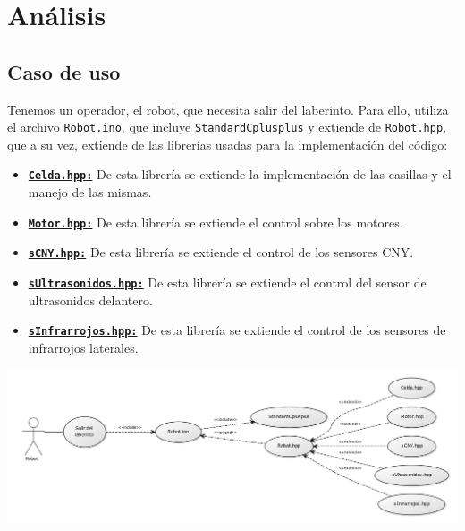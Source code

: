 \chapter{Análisis}
\section{Caso de uso}


Tenemos un operador, el robot, que necesita salir del laberinto. Para ello, utiliza el archivo \hyperlink{laberinto}{\texttt{Robot.ino}}, que incluye \hyperlink{StandardCplusplus}{\texttt{StandardCplusplus}} y extiende de \hyperlink{Robot}{\texttt{Robot.hpp}}, que a su vez, extiende de las librerías usadas para la implementación del código:
\begin{itemize}
	\item \hyperlink{Celda}{\textbf{\texttt{Celda.hpp:}}} De esta librería se extiende la implementación de las casillas y el manejo de las mismas.
	\item \hyperlink{Motor}{\textbf{\texttt{Motor.hpp:}}} De esta librería se extiende el control sobre los motores.
	\item \hyperlink{sCNY}{\textbf{\texttt{sCNY.hpp:}}} De esta librería se extiende el control de los sensores CNY.
	\item \hyperlink{sUltrasonidos}{\textbf{\texttt{sUltrasonidos.hpp:}}} De esta librería se extiende el control del sensor de ultrasonidos delantero.
	\item \hyperlink{sInfrarrojos}{\textbf{\texttt{sInfrarrojos.hpp:}}} De esta librería se extiende el control de los sensores de infrarrojos laterales.
\end{itemize}

\begin{center}
	\includegraphics[scale=0.375]{CasoUso.png}
\end{center}
\newpage

